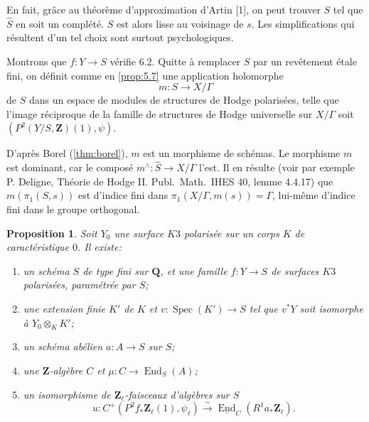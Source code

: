\documentclass[11pt]{amsart}
\theoremstyle{plain}
\newtheorem{proposition}[theoreme]{Proposition}
\theoremstyle{definition}
\theoremstyle{remark}
\begin{document}
En fait, gr\^ace au th\'eor\`eme d'approximation d'Artin [1], on peut trouver $S$ tel que $\hat{S}$ en soit un compl\'et\'e. $S$ est alors lisse au voisinage de $s$. Les simplifications qui r\'esultent d'un tel choix sont surtout psychologiques.

Montrons que $f\colon Y\to S$ v\'erifie 6.2. Quitte \`a remplacer $S$ par un rev\^etement \'etale fini, on d\'efinit comme en \ref{prop:5.7} une application holomorphe
\begin{equation*}
m\colon S\to X/\Gamma
\end{equation*}
de $S$ dans un espace de modules de structures de Hodge polaris\'ees, telle que l'image r\'eciproque de la famille de structures de Hodge universelle sur $X/\Gamma$ soit $(P^2(Y/S,\mathbf{Z})(1),\psi)$.

D'apr\`es Borel (\ref{thm:borel}), $m$ est un morphisme de sch\'emas. Le morphisme $m$ est dominant, car le compos\'e $m^\wedge\colon\hat{S}\to X/\Gamma$ l'est. Il en r\'esulte (voir par exemple P. Deligne, Th\'eorie de Hodge II. Publ.\ Math.\ IHES 40, lemme 4.4.17) que $m(\pi_1(S,s))$ est d'indice fini dans $\pi_1(X/\Gamma,m(s))=\Gamma$, lui-m\^eme d'indice fini dans le groupe orthogonal.

\begin{proposition}\label{prop:6.5}
Soit $Y_0$ une surface $K3$ polaris\'ee sur un corps $K$ de caract\'eristique $0$. Il existe:
\begin{enumerate}
\item[a)] un sch\'ema $S$ de type fini sur $\mathbf{Q}$, et une famille $f\colon Y\to S$ de surfaces $K3$ polaris\'ees, param\'etr\'ee par $S$;
\item[b)] une extension finie $K'$ de $K$ et $v\colon\operatorname{Spec}(K')\to S$ tel que $v^*Y$ soit isomorphe \`a $Y_0\otimes_KK'$;
\item[c)] un sch\'ema ab\'elien $a\colon A\to S$ sur $S$;
\item[d)] une $\mathbf{Z}$-alg\`ebre $C$ et $\mu\colon C\to\operatorname{End}_S(A)$;
\item[e)] un isomorphisme de $\mathbf{Z}_\ell$-faisceaux d'alg\`ebres sur $S$
\begin{equation*}
u\colon C^+(P^2f_*\mathbf{Z}_\ell(1),\psi_\ell)\xrightarrow{\sim}\underline{\operatorname{End}}_C(R^1a_*\mathbf{Z}_\ell).
\end{equation*}
\end{enumerate}
\end{proposition}
\end{document}
